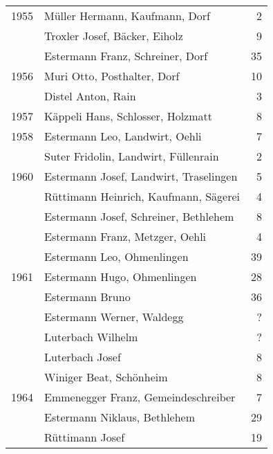 {\begin{longtable}{ l l r }
        1955          & Müller Hermann, Kaufmann, Dorf            & 2           \\
                      & Troxler Josef, Bäcker, Eiholz             & 9           \\
                      & Estermann Franz, Schreiner, Dorf          & 35          \\
        1956          & Muri Otto, Posthalter, Dorf               & 10          \\
                      & Distel Anton, Rain                        & 3           \\
        1957          & Käppeli Hans, Schlosser, Holzmatt         & 8           \\
        1958          & Estermann Leo, Landwirt, Oehli            & 7           \\
                      & Suter Fridolin, Landwirt, Füllenrain      & 2           \\
        1960          & Estermann Josef, Landwirt, Traselingen    & 5           \\
                      & Rüttimann Heinrich, Kaufmann, Sägerei     & 4           \\
                      & Estermann Josef, Schreiner, Bethlehem     & 8           \\
                      & Estermann Franz, Metzger, Oehli           & 4           \\
                      & Estermann Leo, Ohmenlingen                & 39          \\
        1961          & Estermann Hugo, Ohmenlingen               & 28          \\
                      & Estermann Bruno                           & 36          \\
                      & Estermann Werner, Waldegg                 & ?           \\
                      & Luterbach Wilhelm                         & ?           \\
                      & Luterbach Josef                           & 8           \\
                      & Winiger Beat, Schönheim                   & 8           \\
        1964          & Emmenegger Franz, Gemeindeschreiber       & 7           \\
                      & Estermann Niklaus, Bethlehem              & 29          \\
                      & Rüttimann Josef                           & 19          \\

\end{longtable}}
